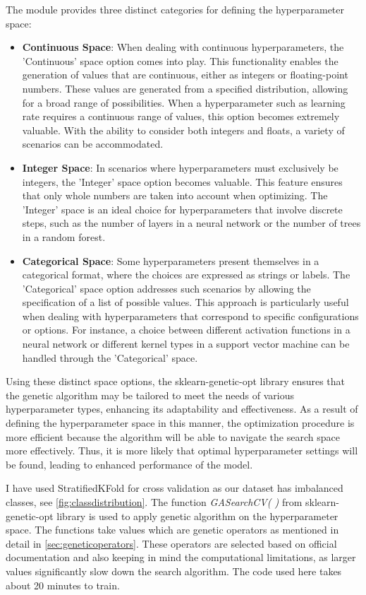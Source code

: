 The module provides three distinct categories for defining the hyperparameter space:
\begin{itemize}
    \item \textbf{Continuous Space}: When dealing with continuous hyperparameters, the 'Continuous' space option comes into play. This functionality enables the generation of values that are continuous, either as integers or floating-point numbers. These values are generated from a specified distribution, allowing for a broad range of possibilities. When a hyperparameter such as learning rate requires a continuous range of values, this option becomes extremely valuable. With the ability to consider both integers and floats, a variety of scenarios can be accommodated.
    \item \textbf{Integer Space}: In scenarios where hyperparameters must exclusively be integers, the 'Integer' space option becomes valuable. This feature ensures that only whole numbers are taken into account when optimizing. The 'Integer' space is an ideal choice for hyperparameters that involve discrete steps, such as the number of layers in a neural network or the number of trees in a random forest.
    \item \textbf{Categorical Space}: Some hyperparameters present themselves in a categorical format, where the choices are expressed as strings or labels. The 'Categorical' space option addresses such scenarios by allowing the specification of a list of possible values. This approach is particularly useful when dealing with hyperparameters that correspond to specific configurations or options. For instance, a choice between different activation functions in a neural network or different kernel types in a support vector machine can be handled through the 'Categorical' space.
\end{itemize}
Using these distinct space options, the sklearn-genetic-opt library ensures that the genetic algorithm may be tailored to meet the needs of various hyperparameter types, enhancing its adaptability and effectiveness. As a result of defining the hyperparameter space in this manner, the optimization procedure is more efficient because the algorithm will be able to navigate the search space more effectively. Thus, it is more likely that optimal hyperparameter settings will be found, leading to enhanced performance of the model.

I have used StratifiedKFold for cross validation as our dataset has imbalanced classes, see \autoref{fig:classdistribution}. The function \textit{GASearchCV( )} from sklearn-genetic-opt library is used to apply genetic algorithm on the hyperparameter space. The functions take values which are genetic operators as mentioned in detail in \autoref{sec:geneticoperators}. These operators are selected based on official documentation and also keeping in mind the computational limitations, as larger values significantly slow down the search algorithm. The code used here takes about 20 minutes to train.

